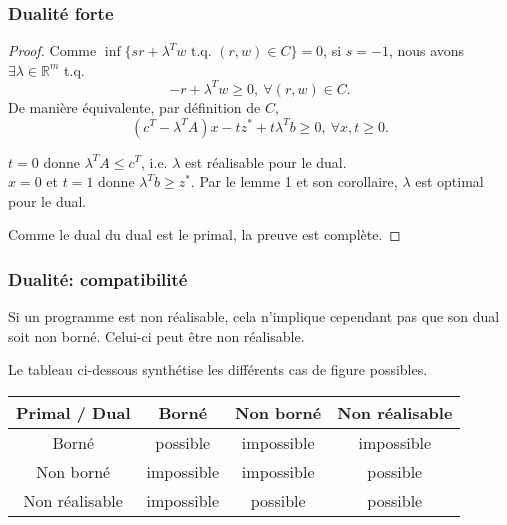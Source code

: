 \documentclass[usepdftitle=false]{beamer}
\def\RR{\mathbb{R}}
\begin{document}
\begin{frame}
\frametitle{Dualité forte}

\begin{proof}
Comme $\inf \lbrace s r + \lambda^T w \mbox{ t.q. } (r,w) \in C \rbrace = 0$, si $s = -1$, nous avons $\exists \lambda \in \RR^m$ t.q.
\[
-r + \lambda^Tw \geq 0,\ \forall (r,w) \in C.
\]
De manière équivalente, par définition de $C$,
\[
(c^T-\lambda^TA)x - tz^* + t\lambda^T b \geq 0,\ \forall x, t \geq 0.
\]

\mbox{}

$t = 0$ donne $\lambda^T A \leq c^T$, i.e. $\lambda$ est réalisable pour le dual.\\
$x = 0$ et $t = 1$ donne $\lambda^T b \geq z^*$. Par le lemme 1 et son corollaire, $\lambda$ est optimal pour le dual.

\mbox{}

Comme le dual du dual est le primal, la preuve est complète.
\end{proof}

\end{frame}

\begin{frame}
\frametitle{Dualité: compatibilité}

Si un programme est non réalisable, cela n'implique cependant pas que son dual soit non borné. Celui-ci peut être non réalisable.

\mbox{}

Le tableau ci-dessous synthétise les différents cas de figure possibles.

\begin{center}
\begin{tabular}{|c||c|c|c|}
\hline
Primal / Dual & Borné & Non borné & Non réalisable \\
\hline
\hline
Borné & possible & impossible & impossible \\
\hline
Non borné & impossible & impossible & possible \\
\hline
Non réalisable & impossible & possible & possible \\
\hline
\end{tabular}
\end{center}

\end{frame}
\end{document}

